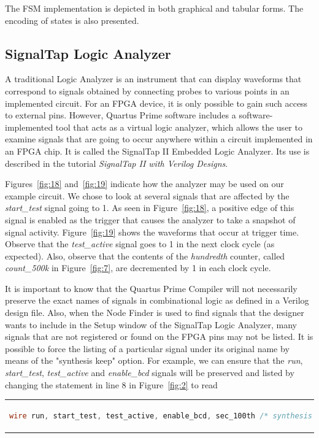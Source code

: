 \documentclass[11pt, twoside, pdftex]{article}
\begin{document}
The FSM implementation is depicted in both graphical and tabular forms.
The encoding of states is also presented. 

\subsection{SignalTap Logic Analyzer}
A traditional Logic Analyzer is an instrument that can display waveforms that
correspond to signals obtained by connecting probes to various points in an
implemented circuit. For an FPGA device, it is only possible to gain such access
to external pins. However, Quartus Prime software includes a software-implemented tool 
that acts as a virtual logic analyzer, which allows the user to examine signals
that are going to occur anywhere within a circuit implemented in an FPGA chip. 
It is called the SignalTap II Embedded Logic Analyzer. Its use is described in the
tutorial {\it SignalTap II with Verilog Designs}.

Figures~\ref{fig:18} and~\ref{fig:19} indicate how the analyzer may be used on our example
circuit. We chose to look at several signals that are affected by the
{\it start\_test} signal going to 1. As seen in Figure~\ref{fig:18}, a positive edge
of this signal is enabled as the trigger that causes the analyzer to take a 
snapshot of signal activity. Figure~\ref{fig:19} shows the waveforms that occur at
trigger time. Observe that the {\it test\_active} signal goes to 1 in the
next clock cycle (as expected). Also, observe that the contents of the
{\it hundredth} counter, called {\it count\_500k} in Figure~\ref{fig:7}, are decremented
by 1 in each clock cycle.

It is important to know that the Quartus Prime Compiler will not necessarily 
preserve the exact names of signals in combinational logic as defined in a Verilog
design file. Also, when the Node Finder is used to find signals that the
designer wants to include in the Setup window of the SignalTap Logic Analyzer,
many signals that are not registered or found on the FPGA pins may not be listed.
It is possible to force the listing of a particular signal under its original name
by means of the "synthesis keep" option. For example, we can ensure that the
{\it run}, {\it start\_test}, {\it test\_active} and {\it enable\_bcd} signals
will be preserved and listed by changing the statement in line 8 in Figure~\ref{fig:2}
to read

\begin{center}
\begin{tabular}{c}
\begin{lstlisting}[language=Verilog]
wire run, start_test, test_active, enable_bcd, sec_100th /* synthesis keep */;
\end{lstlisting}
\end{tabular}
\end{center}
\end{document}
